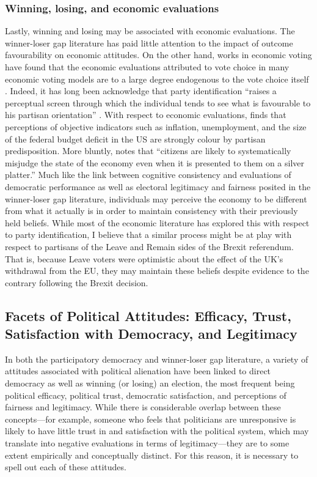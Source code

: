 \documentclass[12pt, letter]{article}
\begin{document}
\subsubsection{Winning, losing, and economic evaluations}

Lastly, winning and losing may be associated with economic evaluations. The winner-loser gap literature has paid little attention to the impact of outcome favourability on economic attitudes. On the other hand, works in economic voting have found that the economic evaluations attributed to vote choice in many economic voting models are to a large degree endogenous to the vote choice itself \parencite{wlezien1997economic}. Indeed, it has long been acknowledge that party identification ``raises a perceptual screen through which the individual tends to see what is favourable to his partisan orientation'' \parencite{theamericanvoter}. With respect to economic evaluations, \textcite{bartels2002beyond} finds that perceptions of objective indicators such as inflation, unemployment, and the size of the federal budget deficit in the US are strongly colour by partisan predisposition. More bluntly, \textcite[280]{anderson2007end} notes that 
``citizens are likely to systematically misjudge the state of the economy even when it is presented to them on a silver platter.'' Much like the link between cognitive consistency and evaluations of democratic performance as well as electoral legitimacy and fairness posited in the winner-loser gap literature, individuals may perceive the economy to be different from what it actually is in order to maintain consistency with their previously held beliefs. While most of the economic literature has explored this with respect to party identification, I believe that a similar process might be at play with respect to partisans of the Leave and Remain sides of the Brexit referendum. That is, because Leave voters were optimistic about the effect of the UK's withdrawal from the EU, they may maintain these beliefs despite evidence to the contrary following the Brexit decision. 


\subsection{Facets of Political Attitudes: Efficacy, Trust, Satisfaction with Democracy, and Legitimacy}

In both the participatory democracy and winner-loser gap literature, a variety of attitudes associated with political alienation have been linked to direct democracy as well as winning (or losing) an election, the most frequent being political efficacy, political trust, democratic satisfaction, and perceptions of fairness and legitimacy. While there is considerable overlap between these concepts---for example, someone who feels that politicians are unresponsive is likely to have little trust in and satisfaction with the political system, which may translate into negative evaluations in terms of legitimacy---they are to some extent empirically and conceptually distinct. For this reason, it is necessary to spell out each of these attitudes.
\end{document}
